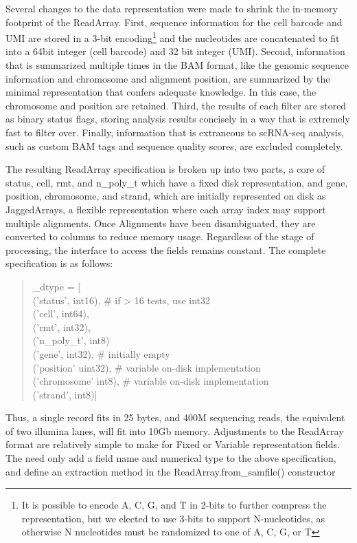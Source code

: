 Several changes to the data representation were made to shrink the in-memory footprint of the ReadArray. 
First, sequence information for the cell barcode and UMI are stored in a 3-bit encoding\footnote{It is possible to encode A, C, G, and T in 2-bits to further compress the representation, but we elected to use 3-bits to support N-nucleotides, as otherwise N nucleotides must be randomized to one of A, C, G, or T} and the nucleotides are concatenated to fit into a 64bit integer (cell barcode) and 32 bit integer (UMI).
Second, information that is summarized multiple times in the BAM format, like the genomic sequence information and chromosome and alignment position, are summarized by the minimal representation that confers adequate knowledge. 
In this case, the chromosome and position are retained.
Third, the results of each filter are stored as binary status flags, storing analysis results concisely in a way that is extremely fast to filter over.
Finally, information that is extraneous to scRNA-seq analysis, such as custom BAM tags and sequence quality scores, are excluded completely. 

The resulting ReadArray specification is broken up into two parts, a core of status, {\mono cell, rmt,} and {\mono n\_poly\_t} which have a fixed disk representation, and {\mono gene, position, chromosome,} and {\mono strand}, which are initially represented on disk as JaggedArrays, a flexible representation where each array index may support multiple alignments. Once Alignments have been disambiguated, they are converted to columns to reduce memory usage. 
Regardless of the stage of processing, the interface to access the fields remains constant.
The complete specification is as follows: 
\begin{quote}
\onehalfspacing
{\mono
\_dtype = [ \\
\quad('status', int16),   \# if > 16 tests, use int32\\
\quad('cell', int64),\\
\quad('rmt', int32),\\
\quad('n\_poly\_t', int8)\\
\quad('gene', int32),     \# initially empty\\
\quad('position' uint32), \# variable on-disk implementation\\
\quad('chromosome' int8), \# variable on-disk implementation\\
\quad('strand', int8)]\\
}
\end{quote}
Thus, a single record fits in 25 bytes, and 400M sequencing reads, the equivalent of two illumina lanes, will fit into 10Gb memory.
Adjustments to the ReadArray format are relatively simple to make for Fixed or Variable representation fields. 
The need only add a field name and numerical type to the above specification, and define an extraction method in the {\mono ReadArray.from\_samfile()} constructor

